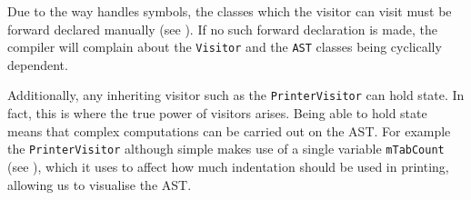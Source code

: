Due to the way \CC{} handles symbols, the classes which the
visitor can visit must be forward declared manually (see
). If no such forward declaration is
made, the compiler will complain about the \texttt{Visitor} and
the \texttt{AST} classes being cyclically dependent.

Additionally, any inheriting visitor such as the
\texttt{PrinterVisitor} can hold state. In fact, this is where
the true power of visitors arises. Being able to hold state
means that complex computations can be carried out on the AST.
For example the \texttt{PrinterVisitor} although simple makes
use of a single variable \texttt{mTabCount} (see
), which it uses to affect how much
indentation should be used in printing, allowing us to visualise
the AST.


